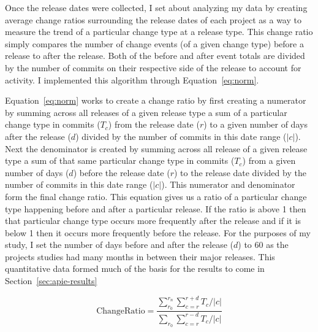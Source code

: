 Once the release dates were collected, I set about analyzing my data by creating average change ratios surrounding the release dates of each 
project as a way to measure the trend of a particular change type at a release type. This change ratio simply compares the number of change events (of a given
change type) before a release to after the release. Both of the before and after event totals are divided by the number of commits on their respective side
of the release to account for activity. I implemented this algorithm through Equation~\ref{eq:norm}.

Equation~\ref{eq:norm} works to create a change ratio by first creating a numerator by summing across all releases of
a given release type a sum of a particular change type in commits ($T_c$)
from the release date ($r$) to a given number of days after the release ($d$) divided by the number of commits in this date range ($|c|$). Next the denominator
is created by summing across all release of a given release type
a sum of that same particular change type in commits ($T_c$) from a given number of days ($d$) before the release date ($r$) to
the release date divided by the number of commits in this date range ($|c|$). This numerator and denominator form the final change ratio.
This equation gives us a ratio of a particular change type happening before and after a particular release. If the ratio is above 1 then that particular change
type occurs more frequently after the release and if it is below 1 then it occurs more frequently before the release. For the purposes of my study, I set the
number of days before and after the release ($d$) to 60 as the projects studies had many months in between their major releases. This quantitative data
formed much of the basis for the results to come in Section~\ref{sec:apie-results}

\begin{equation}
\text{ChangeRatio} = \frac{ \sum_{r_0}^{r_n}\sum_{c=r}^{r+d} T_c / |c|} { \sum_{r_0}\sum_{c=r}^{r-d} T_c / |c|}
\label{eq:norm}
\end{equation}

